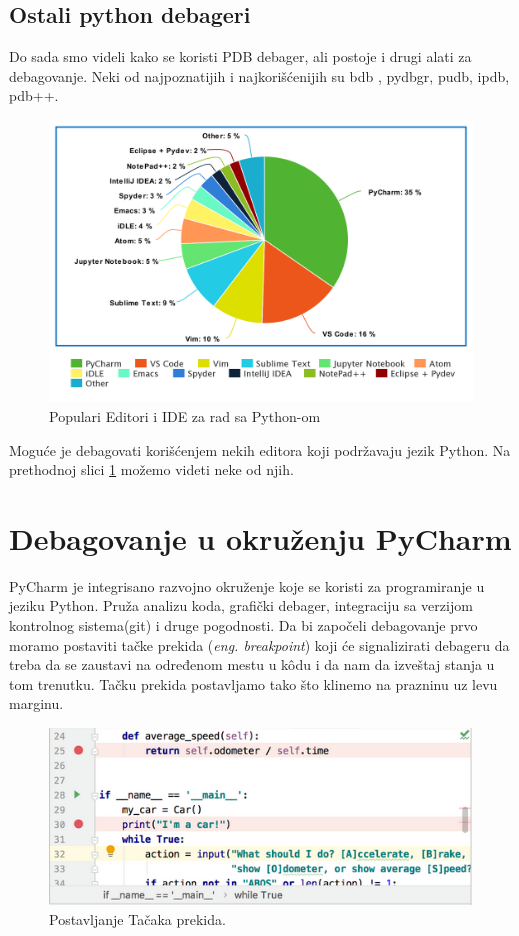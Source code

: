 \documentclass[a4paper]{article}
\begin{document}
\subsection{Ostali python debageri}
Do sada smo videli kako se koristi PDB debager, ali postoje i drugi alati za debagovanje. Neki od najpoznatijih i najkorišćenijih su bdb \cite{bdbDocPyt}, pydbgr, pudb, ipdb, pdb++.
\begin{figure}[h!]
\begin{center}
\includegraphics[scale=0.25]{pie.png}
\end{center}
\caption{Populari Editori i IDE za rad sa Python-om}
\label{fig:pie}
\end{figure}

Moguće je debagovati korišćenjem nekih editora koji podržavaju jezik Python. Na prethodnoj slici \ref{fig:pie} možemo videti neke od njih.

\section{Debagovanje u okruženju PyCharm}
PyCharm je integrisano razvojno okruženje koje se koristi za programiranje u jeziku Python. Pruža analizu koda, grafički debager, integraciju sa verzijom kontrolnog sistema(git) i druge pogodnosti. Da bi započeli debagovanje prvo moramo postaviti tačke prekida (\emph{eng. breakpoint}) koji će signalizirati debageru  da treba da se zaustavi na određenom mestu u k\^{o}du i da nam da izveštaj stanja u tom trenutku. Tačku prekida postavljamo tako što klinemo na prazninu uz levu marginu.
\begin{figure}[h!]
\begin{center}
\includegraphics[scale = 0.4]{1}
\end{center}
\caption{Postavljanje Tačaka prekida.}
\label{1}
\end{figure}
\end{document}
